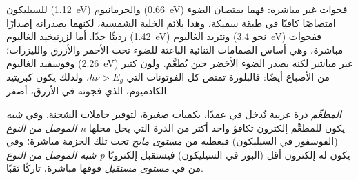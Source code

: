 للسيليكون (\qty{1.12}{eV}) والجرمانيوم (\qty{0.66}{eV}) فجوات غير مباشرة:
فهما يمتصان الضوء امتصاصًا كافيًا في طبقة سميكة، وهذا يلائم الخلية الشمسية، لكنهما
يصدرانه إصدارًا رديئًا جدًا. أما لزرنيخيد الغاليوم (\qty{1.42}{eV}) ونتريد الغاليوم (نحو
\qty{3.4}{eV}) ففجوات مباشرة، وهي أساس الصمامات الثنائية الباعثة للضوء تحت الأحمر والأزرق
والليزرات؛ وفوسفيد الغاليوم (\qty{2.26}{eV}) غير مباشر لكنه يصدر الضوء
الأخضر حين يُطعَّم. ولون كثير من الأصباغ  أيضًا: فالبلورة
تمتص كل الفوتونات التي $h\nu > E_g$، ولذلك يكون كبريتيد الكادميوم، الذي فجوته في الأزرق،
أصفر.

\begin{definition}[التطعيم]\label{def:b3:solid-state:doping}
\emph{المطعِّم} ذرة غريبة تُدخل في  عمدًا،
بكميات صغيرة، لتوفير حاملات الشحنة. وفي \emph{شبه الموصل من النوع
n} يكون للمطعِّم إلكترون تكافؤ واحد
أكثر من الذرة التي يحل محلها (الفوسفور في السيليكون) فيعطيه
 من \emph{مستوى مانح} تحت تلك
الحزمة مباشرة؛ وفي \emph{شبه الموصل من النوع p} يكون له
إلكترون أقل (البور في السيليكون) فيستقبل إلكترونًا من  في
\emph{مستوى مستقبل} فوقها مباشرة، تاركًا ثقبًا.
\end{definition}

